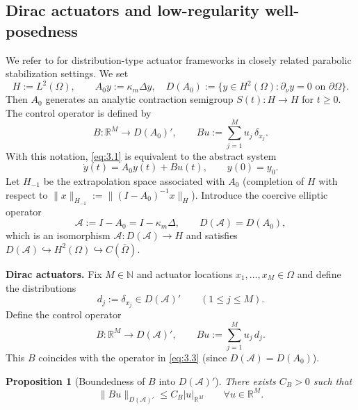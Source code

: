 \documentclass[11pt,a4paper]{article}
\numberwithin{equation}{section}
\newtheorem{proposition}[theorem]{Proposition}
\theoremstyle{definition}
\newcommand{\R}{\mathbb{R}}
\newcommand{\N}{\mathbb{N}}
\newcommand{\Om}{\Omega}
\newcommand{\1}{\mathbbm{1}}
\newcommand{\kappam}{\kappa_m}
\begin{document}
\subsection{Dirac actuators and low-regularity well-posedness}
\label{subsec:wp-Dirac-KRW}
\noindent
We refer to \cite{KunRodWal24-cocv} for distribution-type actuator frameworks
in closely related parabolic stabilization settings.
\newline
We set
\begin{equation}
\label{eq:3.2}
H := L^2(\Om),\qquad
A_0 y := \kappam\Delta y,\quad
D(A_0) := \{ y\in H^2(\Om): \partial_\nu y = 0 \text{ on }\partial\Om\}.
\end{equation}
Then $A_0$ generates an analytic contraction semigroup
$S(t):H\to H$ for $t\ge0$.
\newline
The control operator is defined by
\begin{equation}
\label{eq:3.3}
B:\R^M\to D(A_0)',\qquad
B u := \sum_{j=1}^M u_j\,\delta_{x_j}.
\end{equation}
With this notation, \eqref{eq:3.1} is equivalent to the abstract system
\begin{equation}
\label{eq:3.4}
\dot y(t) = A_0 y(t) + B u(t),\qquad y(0)=y_0.
\end{equation}
Let $H_{-1}$ be the extrapolation space associated with $A_0$ (completion of $H$ with respect to
$\|x\|_{H_{-1}} := \|(I-A_0)^{-1} x\|_{H}$).
\newline
Introduce the coercive elliptic operator
\[
\mathcal A := I - A_0 = I - \kappa_m \Delta,
\qquad D(\mathcal A)=D(A_0),
\]
which is an isomorphism $\mathcal A: D(\mathcal A)\to H$ and satisfies
$D(\mathcal A)\hookrightarrow H^2(\Omega)\hookrightarrow C(\bar\Omega)$.

\medskip
\noindent
\textbf{Dirac actuators.}
Fix $M\in\N$ and actuator locations $x_1,\dots,x_M\in\Omega$ and define the distributions
\[
d_j := \delta_{x_j}\in D(\mathcal A)'\qquad (1\le j\le M).
\]
Define the control operator
\[
B:\R^M\to D(\mathcal A)',\qquad
Bu := \sum_{j=1}^M u_j\,d_j.
\]
This $B$ coincides with the operator in \eqref{eq:3.3} (since $D(\mathcal A)=D(A_0)$).

\begin{proposition}[Boundedness of $B$ into $D(\mathcal A)'$]
\label{prop:B-bounded-DA-dual}
There exists $C_B>0$ such that
\[
\|Bu\|_{D(\mathcal A)'} \le C_B |u|_{\R^M}\qquad \forall u\in\R^M.
\]
\end{proposition}
\end{document}
